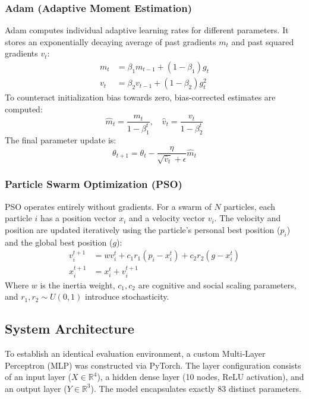\documentclass[12pt, a4paper]{article}
\begin{document}
\subsubsection{Adam (Adaptive Moment Estimation)}
Adam computes individual adaptive learning rates for different parameters. It stores an exponentially decaying average of past gradients $m_t$ and past squared gradients $v_t$:
\begin{align}
    m_t &= \beta_1 m_{t-1} + (1 - \beta_1) g_t \\
    v_t &= \beta_2 v_{t-1} + (1 - \beta_2) g_t^2
\end{align}
To counteract initialization bias towards zero, bias-corrected estimates are computed:
\begin{equation}
    \hat{m}_t = \frac{m_t}{1 - \beta_1^t}, \quad \hat{v}_t = \frac{v_t}{1 - \beta_2^t}
\end{equation}
The final parameter update is:
\begin{equation}
    \theta_{t+1} = \theta_t - \frac{\eta}{\sqrt{\hat{v}_t} + \epsilon} \hat{m}_t
\end{equation}

\subsubsection{Particle Swarm Optimization (PSO)}
PSO operates entirely without gradients. For a swarm of $N$ particles, each particle $i$ has a position vector $x_i$ and a velocity vector $v_i$. The velocity and position are updated iteratively using the particle's personal best position ($p_i$) and the global best position ($g$):
\begin{align}
    v_i^{t+1} &= w v_i^t + c_1 r_1 (p_i - x_i^t) + c_2 r_2 (g - x_i^t) \\
    x_i^{t+1} &= x_i^t + v_i^{t+1}
\end{align}
Where $w$ is the inertia weight, $c_1, c_2$ are cognitive and social scaling parameters, and $r_1, r_2 \sim U(0,1)$ introduce stochasticity.

\subsection{System Architecture}
To establish an identical evaluation environment, a custom Multi-Layer Perceptron (MLP) was constructed via PyTorch. The layer configuration consists of an input layer ($X \in \mathbb{R}^{4}$), a hidden dense layer (10 nodes, ReLU activation), and an output layer ($Y \in \mathbb{R}^{3}$). The model encapsulates exactly 83 distinct parameters.
\end{document}
